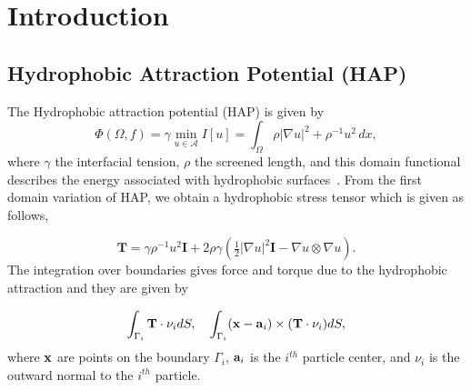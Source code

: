 \documentclass[%
 reprint,
 amsmath,amssymb,
 aps,
]{revtex4-2}
\begin{document}


\maketitle


\section{\label{intro}Introduction}






\subsection{Hydrophobic Attraction Potential (HAP)}


The Hydrophobic attraction potential (HAP) is given by
\begin{equation}
\label{eq:main}
\Phi(\Omega,f) = \gamma  \min_{u \in \mathcal{A}}
 I[u]  = \int_{\Omega} \rho |\nabla u|^2 + \rho^{-1} u^2 \,dx,
\end{equation}
%
where $\gamma$ the interfacial tension, $\rho$ the screened length, and this domain functional describes the energy associated with hydrophobic surfaces~\cite{Fu20}. From the first domain variation of HAP, we obtain a hydrophobic stress tensor which is given as follows, 

\begin{equation}
\label{eq:stress}
\mathbf{T}
= \gamma\rho^{-1}u^2 \mathbf{I} + 2\rho\gamma (\tfrac{1}{2}|\nabla u|^2 \mathbf{I} - \nabla u\otimes \nabla u).
\end{equation}
%
The integration over boundaries gives force and torque due to the hydrophobic attraction and they are given by 

\begin{equation}
\int_{\Gamma_i} {\bf T}\cdot \nu_i dS ,\quad \int_{\Gamma_i} ({\bf x}-{\bf a}_i)\times ({\bf T}\cdot \nu_i) dS,
\end{equation}
%
where ${\bf x}$ are points on the boundary $\Gamma_i$, ${\bf a}_i$ is the $i^{th}$ particle center, and $\nu_i$ is the outward normal to the $i^{th}$ particle.


\end{document}
